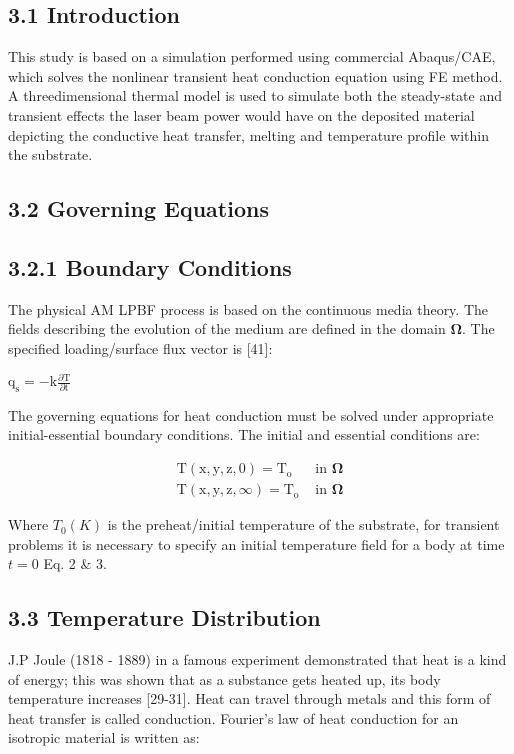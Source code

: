 \documentclass[10pt]{article}
\begin{document}
\subsection*{3.1 Introduction}
This study is based on a simulation performed using commercial Abaqus/CAE, which solves the nonlinear transient heat conduction equation using FE method. A threedimensional thermal model is used to simulate both the steady-state and transient effects the laser beam power would have on the deposited material depicting the conductive heat transfer, melting and temperature profile within the substrate.

\subsection*{3.2 Governing Equations}
\subsection*{3.2.1 Boundary Conditions}
The physical AM LPBF process is based on the continuous media theory. The fields describing the evolution of the medium are defined in the domain $\boldsymbol{\Omega}$. The specified loading/surface flux vector is [41]:

$\mathrm{q}_{\mathrm{s}}=-\mathrm{k} \frac{\partial \mathrm{T}}{\partial \mathrm{t}}$

The governing equations for heat conduction must be solved under appropriate initial-essential boundary conditions. The initial and essential conditions are:

\[
\begin{array}{ll}
\mathrm{T}(\mathrm{x}, \mathrm{y}, \mathrm{z}, 0)=\mathrm{T}_{\mathrm{o}} & \text { in } \boldsymbol{\Omega} \\
\mathrm{T}(\mathrm{x}, \mathrm{y}, \mathrm{z}, \infty)=\mathrm{T}_{\mathrm{o}} & \text { in } \boldsymbol{\Omega} \tag{3}
\end{array}
\]

Where $T_{0}(K)$ is the preheat/initial temperature of the substrate, for transient problems it is necessary to specify an initial temperature field for a body at time $t=0$ Eq. 2 \& 3.

\subsection*{3.3 Temperature Distribution}
J.P Joule (1818 - 1889) in a famous experiment demonstrated that heat is a kind of energy; this was shown that as a substance gets heated up, its body temperature increases [29-31]. Heat can travel through metals and this form of heat transfer is called conduction. Fourier's law of heat conduction for an isotropic material is written as:
\end{document}
